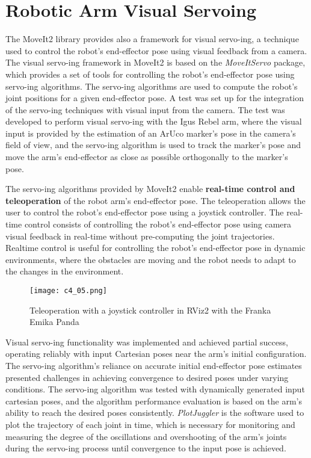 \section{Robotic Arm Visual Servoing}

The MoveIt2 library provides also a framework for visual servo-ing, a technique used to control the robot's
end-effector pose using visual feedback from a camera. The visual servo-ing framework in MoveIt2 is based on the
\textit{MoveItServo} package, which provides a set of tools for controlling the robot's end-effector pose using
servo-ing algorithms. The servo-ing algorithms are used to compute the robot's joint positions for a given end-effector
pose. A test was set up for the integration of the servo-ing techniques with visual input from the camera.
The test was developed to perform visual servo-ing with the Igus Rebel arm, where the visual input
is provided by the estimation of an ArUco marker's pose in the camera's field of view, and the servo-ing algorithm
is used to track the marker's pose and move the arm's end-effector as close as possible orthogonally to the marker's pose.

The servo-ing algorithms provided by MoveIt2 enable \textbf{real-time control and teleoperation} of the robot arm's
end-effector pose. The teleoperation allows the user to control the robot's end-effector pose using a joystick controller.
The real-time control consists of controlling the robot's end-effector pose using camera visual feedback
in real-time without pre-computing the joint trajectories. Realtime control is useful for controlling the robot's
end-effector pose in dynamic environments, where the obstacles are moving and the robot needs to adapt to the changes
in the environment.

\begin{figure}[t]
    \centering
    \texttt{[image: c4\_05.png]}
    \caption{Teleoperation with a joystick controller in RViz2 with the Franka Emika Panda}
    \label{fig:teleop}
\end{figure}

Visual servo-ing functionality was implemented and achieved partial success, operating reliably with input 
Cartesian poses near the arm's initial configuration. The servo-ing algorithm's reliance on accurate initial
end-effector pose estimates presented challenges in achieving convergence to desired poses under varying conditions.
The servo-ing algorithm was tested with dynamically generated input cartesian poses, and the algorithm performance
evaluation is based on the arm's ability to reach the desired poses consistently. 
\textit{PlotJuggler} is the software used to plot the trajectory of each joint in time, which is necessary 
for monitoring and measuring the degree of the oscillations and overshooting of the arm's joints during the servo-ing process
until convergence to the input pose is achieved.

